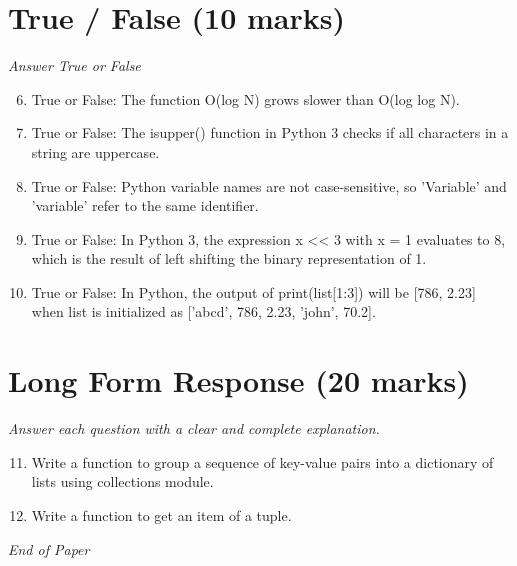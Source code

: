\documentclass[12pt]{article}
\begin{document}
\section*{True / False (10 marks)}
\textit{Answer True or False}
\begin{enumerate}[label=\arabic*.]
\setcounter{enumi}{5}
\item True or False: The function O(log N) grows slower than O(log log N).
\item True or False: The isupper() function in Python 3 checks if all characters in a string are uppercase.
\item True or False: Python variable names are not case-sensitive, so 'Variable' and 'variable' refer to the same identifier.
\item True or False: In Python 3, the expression x \textless{}\textless{} 3 with x = 1 evaluates to 8, which is the result of left shifting the binary representation of 1.
\item True or False: In Python, the output of print(list[1:3]) will be [786, 2.23] when list is initialized as ['abcd', 786, 2.23, 'john', 70.2].
\end{enumerate}

\section*{Long Form Response (20 marks)}
\textit{Answer each question with a clear and complete explanation.}
\begin{enumerate}[label=\arabic*.]
\setcounter{enumi}{10}
\item Write a function to group a sequence of key-value pairs into a dictionary of lists using collections module.
\item Write a function to get an item of a tuple.
\end{enumerate}

\vfill
\noindent\textit{End of Paper}
\end{document}
